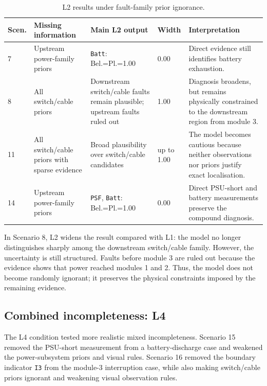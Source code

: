 \documentclass[runningheads]{llncs}
\begin{document}
\begin{table}[H]
\caption{L2 results under fault-family prior ignorance.}\label{tab:l2_results}
\centering
\small
\begin{tabularx}{\textwidth}{p{0.8cm}p{2.6cm}p{4.1cm}p{1.1cm}X}
\toprule
Scen. & Missing information & Main L2 output & Width & Interpretation \\
\midrule
7 & Upstream power-family priors & \texttt{Batt}: Bel.=Pl.=1.00 & 0.00 & Direct evidence still identifies battery exhaustion. \\
8 & All switch/cable priors & Downstream switch/cable faults remain plausible; upstream faults ruled out & 1.00 & Diagnosis broadens, but remains physically constrained to the downstream region from module 3. \\
11 & All switch/cable priors with sparse evidence & Broad plausibility over switch/cable candidates & up to 1.00 & The model becomes cautious because neither observations nor priors justify exact localisation. \\
14 & Upstream power-family priors & \texttt{PSF}, \texttt{Batt}: Bel.=Pl.=1.00 & 0.00 & Direct PSU-short and battery measurements preserve the compound diagnosis. \\
\bottomrule
\end{tabularx}
\end{table}

In Scenario 8, L2 widens the result compared with L1: the model no longer distinguishes sharply among the downstream switch/cable family. However, the uncertainty is still structured. Faults before module 3 are ruled out because the evidence shows that power reached modules 1 and 2. Thus, the model does not become randomly ignorant; it preserves the physical constraints imposed by the remaining evidence.

\subsection{Combined incompleteness: L4}
\label{sec:l4_combined}

The L4 condition tested more realistic mixed incompleteness. Scenario 15 removed the PSU-short measurement from a battery-discharge case and weakened the power-subsystem priors and visual rules. Scenario 16 removed the boundary indicator \texttt{I3} from the module-3 interruption case, while also making switch/cable priors ignorant and weakening visual observation rules.
\end{document}
